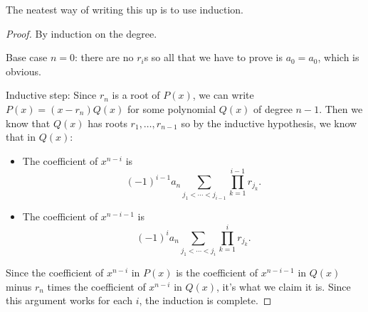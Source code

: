 The neatest way of writing this up is to use induction.
\begin{proof}
  By induction on the degree.

  Base case $n=0$: there are no $r_i$s so all that
  we have to prove is $a_0=a_0$, which is obvious.

  Inductive step: Since $r_n$ is a root of $P(x)$, we can write
  $P(x)=(x-r_n)Q(x)$ for some polynomial $Q(x)$ of degree $n-1$. Then we know
  that $Q(x)$ has roots $r_1,\ldots,r_{n-1}$ so by the inductive hypothesis, we
  know that in $Q(x)$:
  \begin{itemize}
    \item The coefficient of $x^{n-i}$ is
      \[(-1)^{i-1}a_n\sum_{j_1<\cdots<j_{i-1}}\prod_{k=1}^{i-1}r_{j_k}.\]
    \item The coefficient of $x^{n-i-1}$ is
      \[(-1)^{i}a_n\sum_{j_1<\cdots<j_i}\prod_{k=1}^i r_{j_k}.\]
  \end{itemize}
  Since the coefficient of $x^{n-i}$ in $P(x)$ is the coefficient of $x^{n-i-1}$
  in $Q(x)$ minus $r_n$ times the coefficient of $x^{n-i}$ in $Q(x)$, it's what
  we claim it is. Since this argument works for each $i$, the induction is
  complete.
\end{proof}
